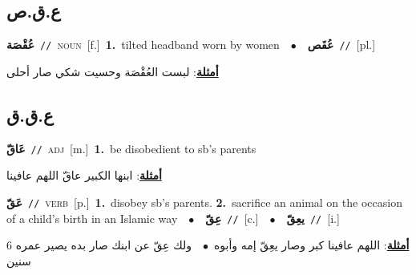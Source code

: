 \documentclass[10pt,a4paper,twoside]{article} %
\begin{document}
\begin{multicols}{2}
\vspace{-3mm}
\subsection*{\color{blue}\foreignlanguage{arabic}{ع.ق.ص}\color{blue}{}} 

{\setlength\topsep{0pt}\textbf{\foreignlanguage{arabic}{عُقْصَة}}\ {\color{gray}\texttt{//}\color{black}}\ \textsc{noun}\ [f.]\ \textbf{1.}~tilted headband worn by women\ \ $\bullet$\ \ \setlength\topsep{0pt}\textbf{\foreignlanguage{arabic}{عُقَص}}\ {\color{gray}\texttt{//}\color{black}}\ [pl.]\  \begin{flushright}\color{gray}\foreignlanguage{arabic}{\textbf{\underline{\foreignlanguage{arabic}{أمثلة}}}: لبست العُقْصَة وحسيت شكي صار أحلى}\end{flushright}\color{black}} \vspace{2mm}

\vspace{-3mm}
\subsection*{\color{blue}\foreignlanguage{arabic}{ع.ق.ق}\color{blue}{}} 

{\setlength\topsep{0pt}\textbf{\foreignlanguage{arabic}{عَاقّ}}\ {\color{gray}\texttt{//}\color{black}}\ \textsc{adj}\ [m.]\ \textbf{1.}~be disobedient to sb's parents\  \begin{flushright}\color{gray}\foreignlanguage{arabic}{\textbf{\underline{\foreignlanguage{arabic}{أمثلة}}}: ابنها الكبير عاقّ اللهم عافينا}\end{flushright}\color{black}} \vspace{2mm}

{\setlength\topsep{0pt}\textbf{\foreignlanguage{arabic}{عَقّ}}\ {\color{gray}\texttt{//}\color{black}}\ \textsc{verb}\ [p.]\ \textbf{1.}~disobey sb's parents.  \textbf{2.}~sacrifice an animal on the occasion of a child's birth in an Islamic way\ \ $\bullet$\ \ \setlength\topsep{0pt}\textbf{\foreignlanguage{arabic}{عِقّ}}\ {\color{gray}\texttt{//}\color{black}}\ [c.]\ \ $\bullet$\ \ \setlength\topsep{0pt}\textbf{\foreignlanguage{arabic}{يعِقّ}}\ {\color{gray}\texttt{//}\color{black}}\ [i.]\  \begin{flushright}\color{gray}\foreignlanguage{arabic}{\textbf{\underline{\foreignlanguage{arabic}{أمثلة}}}: اللهم عافينا كبر وصار يعِقّ إمه وأبوه\ $\bullet$\ \  ولك عِقّ عن ابنك صار بده يصير عمره 6 سنين}\end{flushright}\color{black}} \vspace{2mm}


\end{multicols}
\end{document}
